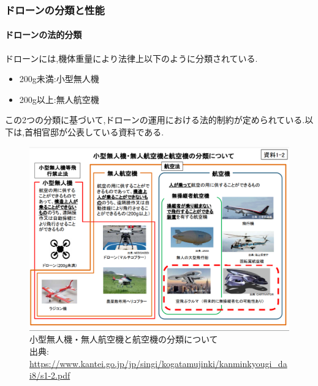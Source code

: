 \documentclass{article}[jsarticle]
\begin{document}
\subsubsection{ドローンの分類と性能}
\paragraph{ドローンの法的分類}
ドローンには,機体重量により法律上以下のように分類されている.
\begin{itemize}
    \item 200g未満:小型無人機
    \item 200g以上:無人航空機
\end{itemize}
この2つの分類に基づいて,ドローンの運用における法的制約が定められている.以下は,首相官邸が公表している資料である.
\begin{figure}[H]
    \centering
    \includegraphics[width=\textwidth]{./Images/20240203205430.png}
    \captionsetup{justification=centering}
    \caption{
        小型無人機・無人航空機と航空機の分類について \\
        出典: \url{https://www.kantei.go.jp/jp/singi/kogatamujinki/kanminkyougi_dai8/s1-2.pdf}
    }
\end{figure}
\end{document}
